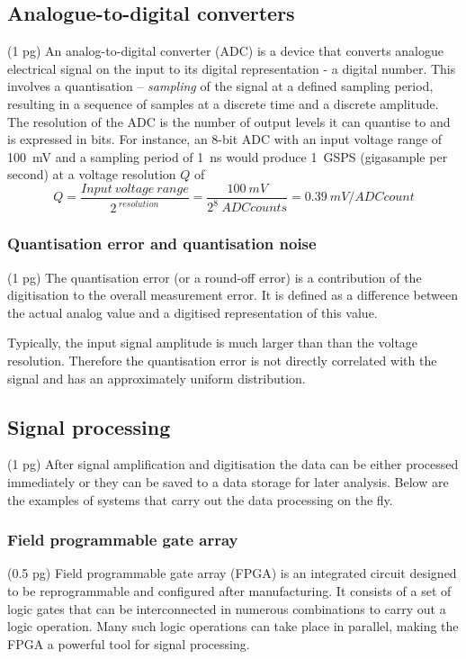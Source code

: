 \documentclass[11pt]{mytustyle}  %
\begin{document}
\subsection{Analogue-to-digital converters}
(1 pg)
An analog-to-digital converter (ADC) is a device that converts analogue electrical signal on the input to its digital representation - a digital number. This involves a quantisation -- \emph{sampling} of the signal at a defined sampling period, resulting in a sequence of samples at a discrete time and a discrete amplitude. The resolution of the ADC is the number of output levels it can quantise to and is expressed in bits. For instance, an 8-bit ADC with an input voltage range of 100~mV and a sampling period of 1~ns would produce 1~GSPS (gigasample per second) at a voltage resolution $Q$ of 
\begin{equation}
\label{eq:mvpercnt}
Q=\frac{Input~voltage~range}{2^{~resolution}}  = \frac{100~mV}{2^8~ADC counts} = 0.39~mV/ADC count
\end{equation} 


\subsubsection{Quantisation error and quantisation noise}
(1 pg)
The quantisation error (or a round-off error) is a contribution of the digitisation to the overall measurement error. It is defined as a difference between the actual analog value and a digitised representation of this value.

Typically, the input signal amplitude is much larger than than the voltage resolution. Therefore the quantisation error is not directly correlated with the signal and has an approximately uniform distribution. 


\subsection{Signal processing}
(1 pg)
After signal amplification and digitisation the data can be either processed immediately or they can be saved to a data storage for later analysis. Below are the examples of systems that carry out the data processing on the fly.

\subsubsection{Field programmable gate array}
(0.5 pg)
Field programmable gate array (FPGA) is an integrated circuit designed to be reprogrammable and configured after manufacturing. It consists of a set of logic gates that can be interconnected in numerous combinations to carry out a logic operation. Many such logic operations can take place in parallel, making the FPGA a powerful tool for signal processing.
\end{document}
